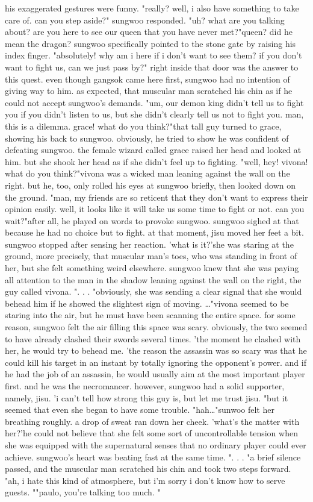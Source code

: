 his exaggerated gestures were funny.
 "really? well, i also have something to take care of.
 can you step aside?" sungwoo responded.
 "uh? what are you talking about? are you here to see our queen that you have never met?"queen? did he mean the dragon? sungwoo specifically pointed to the stone gate by raising his index finger.
 "absolutely! why am i here if i don't want to see them? if you don't want to fight us, can we just pass by?"
right inside that door was the answer to this quest.
 even though gangsok came here first, sungwoo had no intention of giving way to him.
 as expected, that muscular man scratched his chin as if he could not accept sungwoo's demands.
"um, our demon king didn't tell us to fight you if you didn't listen to us, but she didn't clearly tell us not to fight you.
 man, this is a dilemma.
 grace! what do you think?"that tall guy turned to grace, showing his back to sungwoo.
 obviously, he tried to show he was confident of defeating sungwoo.
 the female wizard called grace raised her head and looked at him.
 but she shook her head as if she didn't feel up to fighting.
"well, hey! vivona! what do you think?"vivona was a wicked man leaning against the wall on the right.
 but he, too, only rolled his eyes at sungwoo briefly, then looked down on the ground.
"man, my friends are so reticent that they don't want to express their opinion easily.
 well, it looks like it will take us some time to fight or not.
 can you wait?"after all, he played on words to provoke sungwoo.
 sungwoo sighed at that because he had no choice but to fight.
at that moment, jisu moved her feet a bit.
 sungwoo stopped after sensing her reaction.
 'what is it?'she was staring at the ground, more precisely, that muscular man's toes, who was standing in front of her, but she felt something weird elsewhere.
sungwoo knew that she was paying all attention to the man in the shadow leaning against the wall on the right, the guy called vivona.
".
.
.
"obviously, she was sending a clear signal that she would behead him if he showed the slightest sign of moving.
 …"vivona seemed to be staring into the air, but he must have been scanning the entire space.
for some reason, sungwoo felt the air filling this space was scary.
 obviously, the two seemed to have already clashed their swords several times.
'the moment he clashed with her, he would try to behead me.
'the reason the assassin was so scary was that he could kill his target in an instant by totally ignoring the opponent's power.
 and if he had the job of an assassin, he would usually aim at the most important player first.
 and he was the necromancer.
however, sungwoo had a solid supporter, namely, jisu.
'i can't tell how strong this guy is, but let me trust jisu.
"but it seemed that even she began to have some trouble.
 "hah…"sunwoo felt her breathing roughly.
 a drop of sweat ran down her cheek.
 'what's the matter with her?'he could not believe that she felt some sort of uncontrollable tension when she was equipped with the supernatural senses that no ordinary player could ever achieve.
sungwoo's heart was beating fast at the same time.
".
.
.
"a brief silence passed, and the muscular man scratched his chin and took two steps forward.
"ah, i hate this kind of atmosphere, but i'm sorry i don't know how to serve guests.
""paulo, you're talking too much.
"

